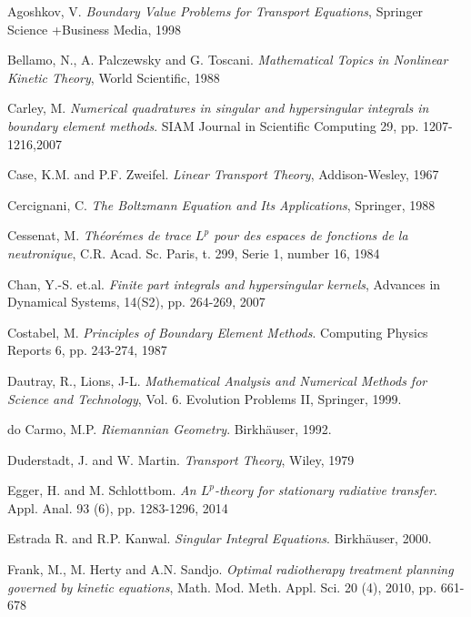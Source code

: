 \documentclass[a4paper,12pt,oneside,reqno]{amsart}
\theoremstyle{theorem}
\begin{document}
\begin{thebibliography}{5}\setlength{\itemsep}{-0.5mm}

 

  Agoshkov, V. \emph{Boundary Value Problems for Transport Equations}, Springer Science +Business Media, 1998 

 Bellamo, N., A. Palczewsky and G. Toscani.  \emph{Mathematical Topics in Nonlinear Kinetic Theory}, World Scientific, 1988 
 

 Carley, M. \emph{Numerical quadratures in singular and hypersingular integrals in boundary element methods}. SIAM Journal in Scientific Computing 29, pp. 1207-1216,2007 

 Case, K.M. and P.F. Zweifel. \emph{ Linear Transport Theory}, Addison-Wesley, 1967

 Cercignani, C. \emph{The Boltzmann Equation and Its Applications},
Springer, 1988

 Cessenat, M. \emph{Th\'eor\'emes de trace $L^p$ pour des espaces de fonctions de la neutronique}, C.R. Acad. Sc. Paris, t. 299, Serie 1, number 16, 1984

 

 Chan, Y.-S. et.al. \emph{Finite part integrals and hypersingular kernels}, Advances in Dynamical Systems, 14(S2), pp. 264-269, 2007
 

 Costabel, M. \emph{Principles of Boundary Element Methods}. Computing Physics Reports 6, pp. 243-274, 1987

 

Dautray, R., Lions, J-L. \emph{Mathematical Analysis and Numerical Methods for Science and Technology}, Vol. 6. Evolution Problems II, Springer, 1999.

 do Carmo, M.P. \emph{Riemannian Geometry}. Birkh\"auser, 1992.


 Duderstadt, J. and W. Martin.  \emph{Transport Theory}, Wiley, 1979

  Egger, H. and M. Schlottbom. \emph{An $L^p$-theory for stationary radiative transfer}. Appl. Anal. 93 (6), pp. 1283-1296, 2014


 Estrada R. and R.P. Kanwal. \emph{Singular Integral Equations}. Birkh\"auser, 2000.

 Frank, M., M. Herty and A.N. Sandjo. \emph{ Optimal  radiotherapy 
treatment planning governed by kinetic equations}, Math. Mod. Meth. Appl. Sci. 20 (4), 2010, pp. 661-678



\end{thebibliography}
\end{document}

